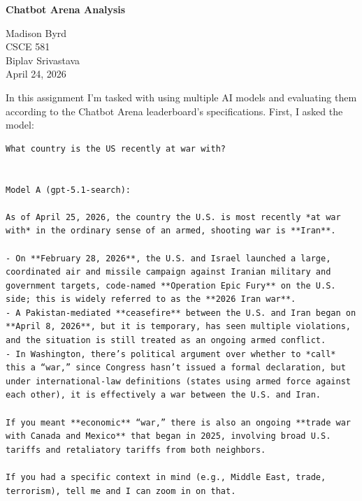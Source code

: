 \documentclass[12pt]{article}
\begin{document}
\begin{titlepage}
\centering
\vspace*{2in}

{\Large \textbf{Chatbot Arena Analysis}}

\vspace{1.5in}

Madison Byrd \\
CSCE 581 \\
Biplav Srivastava \\
April 24, 2026 \\ 

\vfill
\end{titlepage}

\newpage

In this assignment I'm tasked with using multiple AI models and evaluating them 
according to the Chatbot Arena leaderboard's specifications. First, I asked the model:

\begin{verbatim}
What country is the US recently at war with?


Model A (gpt-5.1-search):

As of April 25, 2026, the country the U.S. is most recently *at war with* in the ordinary sense of an armed, shooting war is **Iran**.  

- On **February 28, 2026**, the U.S. and Israel launched a large, coordinated air and missile campaign against Iranian military and government targets, code‑named **Operation Epic Fury** on the U.S. side; this is widely referred to as the **2026 Iran war**.   
- A Pakistan‑mediated **ceasefire** between the U.S. and Iran began on **April 8, 2026**, but it is temporary, has seen multiple violations, and the situation is still treated as an ongoing armed conflict.   
- In Washington, there’s political argument over whether to *call* this a “war,” since Congress hasn’t issued a formal declaration, but under international-law definitions (states using armed force against each other), it is effectively a war between the U.S. and Iran.   

If you meant **economic** “war,” there is also an ongoing **trade war with Canada and Mexico** that began in 2025, involving broad U.S. tariffs and retaliatory tariffs from both neighbors.   

If you had a specific context in mind (e.g., Middle East, trade, terrorism), tell me and I can zoom in on that.
\end{verbatim}
\end{document}
